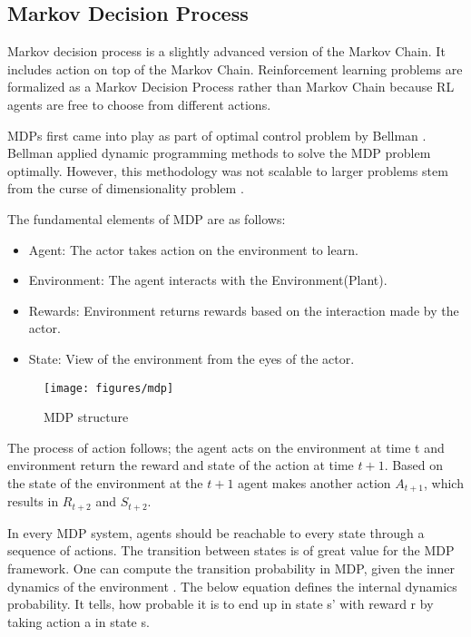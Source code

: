 \subsection{Markov Decision Process}

Markov decision process is a slightly advanced version of the Markov Chain. It includes action on top of the Markov Chain. Reinforcement learning problems are formalized as a Markov Decision Process rather than Markov Chain because RL agents are free to choose from different actions.

MDPs first came into play as part of optimal control problem by Bellman \cite{Bellman1958}. Bellman applied dynamic programming methods to solve the MDP problem optimally. However, this methodology was not scalable to larger problems stem from the curse of dimensionality problem \cite{Sutton}.

The fundamental elements of MDP are as follows:
\begin{itemize}
    \item Agent:  The actor takes action on the environment to learn.
    \item Environment: The agent interacts with the Environment(Plant).
    \item Rewards: Environment returns rewards based on the interaction made by the actor.
    \item State: View of the environment from the eyes of the actor. 
\end{itemize}

\begin{figure}[htbp]
    \centering
    \texttt{[image: figures/mdp]}
    \caption{MDP structure}
    \label{fig: mdp}
\end{figure}

The process of action follows; the agent acts on the environment at time t and environment return the reward and state of the action at time \(t+1\). Based on the state of the environment at the \(t+1\) agent makes another action \(A_{t+1}\), which results in \(R_{t+2}\) and \(S_{t+2}\).

In every MDP system, agents should be reachable to every state through a sequence of actions. The transition between states is of great value for the MDP framework.
One can compute the transition probability in MDP, given the inner dynamics of the environment \cite{Sutton2018}. The below equation defines the internal dynamics probability. It tells, how probable it is to end up in state s’ with reward r by taking action a in state s. 


